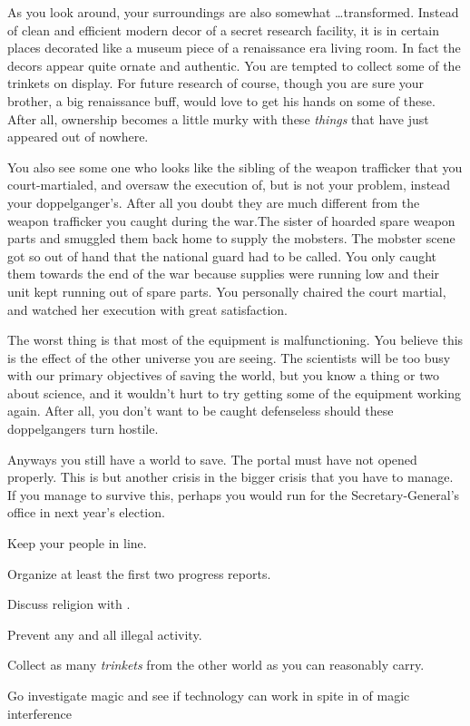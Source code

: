 \documentclass[char]{guildcamp3}
\begin{document}
As you look around, your surroundings are also somewhat \ldots transformed. Instead of clean and efficient modern decor of a secret research facility, it is in certain places decorated like a museum piece of a renaissance era living room. In fact the decors appear quite ornate and authentic. You are tempted to collect some of the trinkets on display. For future research of course, though you are sure your brother, a big renaissance buff, would love to get his hands on some of these. After all, ownership becomes a little murky with these \emph{things} that have just appeared out of nowhere.

You also see some one who looks like the sibling of the weapon trafficker that you court-martialed, and oversaw the execution of, but \cRogueOne{\they} is not your problem, instead your doppelganger's. After all you doubt they are much different from the weapon trafficker you caught during the war.The sister of \cRogueOne{\intro} hoarded spare weapon parts and smuggled them back home to supply the mobsters. The mobster scene got so out of hand that the national guard had to be called. You only caught them towards the end of the war because supplies were running low and their unit kept running out of spare parts. You personally chaired the court martial, and watched her execution with great satisfaction.

The worst thing is that most of the equipment is malfunctioning. You believe this is the effect of the other universe you are seeing. The scientists will be too busy with our primary objectives of saving the world, but you know a thing or two about science, and it wouldn't hurt to try getting some of the equipment working again. After all, you don't want to be caught defenseless should these doppelgangers turn hostile.

Anyways you still have a world to save. The portal must have not opened properly. This is but another crisis in the bigger crisis that you have to manage. If you manage to survive this, perhaps you would run for the Secretary-General's office in next year's election.



\begin{itemz}[Goals]
  \item Keep your people in line.
  \item Organize at least the first two progress reports.
  \item Discuss religion with \cPaladin{}.
  \item Prevent any and all illegal activity.
  \item Collect as many \emph{trinkets} from the other world as you can reasonably carry.
  \item Go investigate magic and see if technology can work in spite in of magic interference
\end{itemz}
\end{document}
